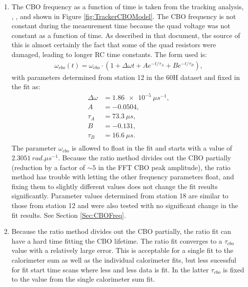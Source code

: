 	\begin{enumerate}
		\item{The CBO frequency as a function of time is taken from the tracking analysis, , \cite{TrackerFreq}, and shown in Figure \ref{fig:TrackerCBOModel}. The CBO frequency is not constant during the measurement time because the quad voltage was not constant as a function of time. As described in that document, the source of this is almost certainly the fact that some of the quad resistors were damaged, leading to longer RC time constants. The form used is:
			\begin{gather}
				\omega_{cbo}(t) = \omega_{cbo} \cdot (1 + \Delta\omega t + A e^{-t/\tau_{A}} + B e^{-t/\tau_{B}}),
			\label{Eqn:CBOFreq}
			\end{gather}
		with parameters determined from station 12 in the 60H dataset and fixed in the fit as:
			\begin{equation*}	
			\begin{aligned}
			 	\Delta\omega &= \SI{1.86e-5}{\mu s^{-1}}, \\
			 	A &= -0.0504, \\
			 	\tau_{A} &= \SI{73.3}{\mu s}, \\
			 	B &= -0.131, \\
			 	\tau_{B} &= \SI{16.6}{\mu s}. \\
			\end{aligned}
			\end{equation*}
		The parameter $\omega_{cbo}$ is allowed to float in the fit and starts with a value of $\SI{2.3051}{rad.\mu s^{-1}}$. Because the ratio method divides out the CBO partially (reduction by a factor of $\sim5$ in the FFT CBO peak amplitude), the ratio method has trouble with letting the other frequency parameters float, and fixing them to slightly different values does not change the fit results significantly. Parameter values determined from station 18 are similar to those from station 12 and were also tested with no significant change in the fit results. See Section \ref{Sec:CBOFreq}.}
		\item{Because the ratio method divides out the CBO partially, the ratio fit can have a hard time fitting the CBO lifetime. The ratio fit converges to a $\tau_{cbo}$ value with a relatively large error. This is acceptable for a single fit to the calorimeter sum as well as the individual calorimeter fits, but less sucessful for fit start time scans where less and less data is fit. In the latter $\tau_{cbo}$ is fixed to the value from the single calorimeter sum fit.}

\end{enumerate}
